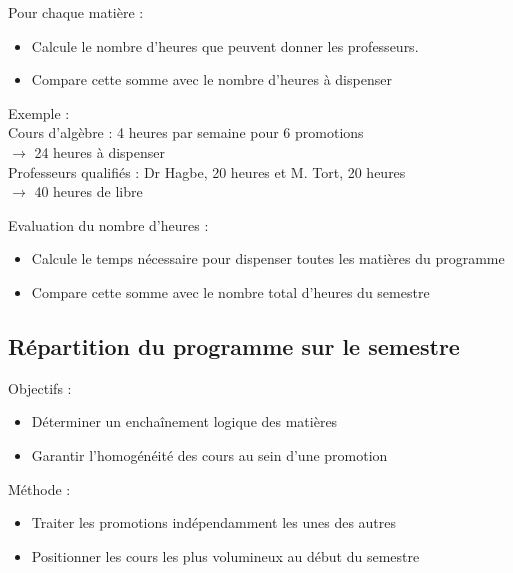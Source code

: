 \documentclass{beamer}
\begin{document}
\begin{frame}
Pour chaque matière :
\begin{itemize}
\item Calcule le nombre d'heures que peuvent donner les professeurs.
\item Compare cette somme avec le nombre d'heures à dispenser
\end{itemize}
\vspace{\baselineskip}
Exemple :\\
Cours d'algèbre : 4 heures par semaine pour 6 promotions\\ 
$\rightarrow$ 24 heures à dispenser\\
Professeurs qualifiés : Dr Hagbe, 20 heures et M. Tort, 20 heures\\
$\rightarrow$ 40 heures de libre\\
\end{frame}

\begin{frame}
Evaluation du nombre d'heures :\\
\begin{itemize}
\item Calcule le temps nécessaire pour dispenser toutes les matières du programme
\item Compare cette somme avec le nombre total d'heures du semestre
\end{itemize}
\end{frame}


\subsection{Répartition du programme sur le semestre}
\begin{frame}
Objectifs :
\begin{itemize}
\item Déterminer un enchaînement logique des matières
\item Garantir l'homogénéité des cours au sein d'une promotion
\end{itemize}
\vspace{\baselineskip}
Méthode :
\begin{itemize}
\item Traiter les promotions indépendamment les unes des autres
\item Positionner les cours les plus volumineux au début du semestre
\end{itemize}
\end{frame}
\end{document}
